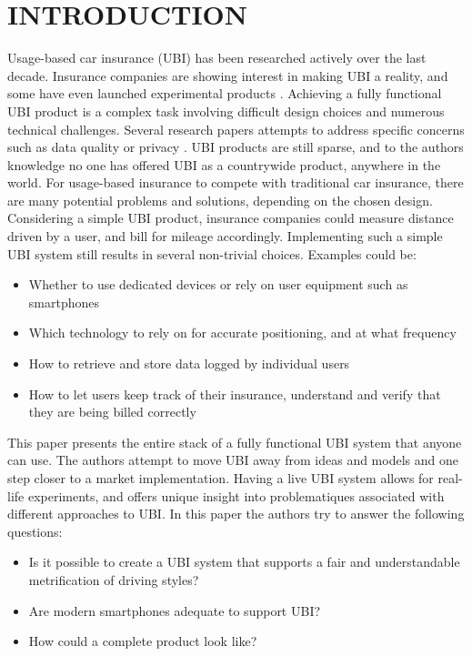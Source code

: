 \section{INTRODUCTION}\label{sec:intro}
Usage-based car insurance (UBI) has been researched actively over the last decade. Insurance companies are showing interest in making UBI a reality, and some have even launched experimental products \citep{allstate_ubi} \citep{progressive_ubi} \citep{qbe_ubi}. Achieving a fully functional UBI product is a complex task involving difficult design choices and numerous technical challenges. Several research papers attempts to address specific concerns such as data quality \citep{art:insurtelematics} or privacy \citep{art:pripayd}. UBI products are still sparse, and to the authors knowledge no one has offered UBI as a countrywide product, anywhere in the world.
For usage-based insurance to compete with traditional car insurance, there are many potential problems and solutions, depending on the chosen design. Considering a simple UBI product, insurance companies could measure distance driven by a user, and bill for mileage accordingly. Implementing such a simple UBI system still results in several non-trivial choices. Examples could be:

\begin{itemize}
\item Whether to use dedicated devices or rely on user equipment such as smartphones
\item Which technology to rely on for accurate positioning, and at what frequency
\item How to retrieve and store data logged by individual users
\item How to let users keep track of their insurance, understand and verify that they are being billed correctly
\end{itemize}

This paper presents the entire stack of a fully functional UBI system that anyone can use. The authors attempt to move UBI away from ideas and models and one step closer to a market implementation. Having a live UBI system allows for real-life experiments, and offers unique insight into problematiques associated with different approaches to UBI. In this paper the authors try to answer the following questions:

\begin{itemize}
\item Is it possible to create a UBI system that supports a fair and understandable metrification of driving styles?
\item Are modern smartphones adequate to support UBI?
\item How could a complete product look like?
\end{itemize}

